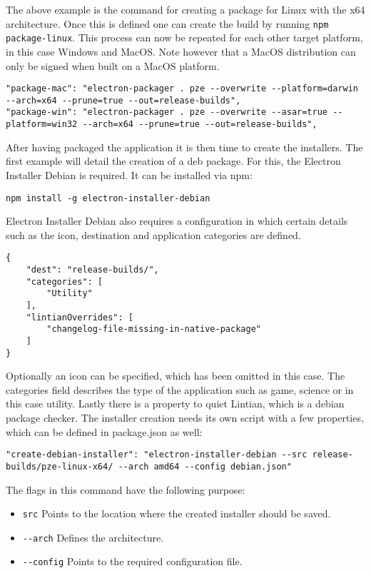 The above example is the command for creating a package for Linux with the x64 architecture.
Once this is defined one can create the build by running \lstinline[columns=fixed]{npm package-linux}.
This process can now be repeated for each other target platform, in this case Windows and MacOS. 
Note however that a MacOS distribution can only be signed when built on a MacOS platform. \parencite{electronDocsDist}
\begin{lstlisting}[caption=Commands for Windows and MacOs builds specified in package.json]
"package-mac": "electron-packager . pze --overwrite --platform=darwin --arch=x64 --prune=true --out=release-builds",
"package-win": "electron-packager . pze --overwrite --asar=true --platform=win32 --arch=x64 --prune=true --out=release-builds",
\end{lstlisting}
After having packaged the application it is then time to create the installers. 
The first example will detail the creation of a \acrshort{deb} package. 
For this, the Electron Installer Debian is required. 
It can be installed via \acrshort{npm}:
\begin{lstlisting}[caption=Installation of electron-installer-debian]
npm install -g electron-installer-debian
\end{lstlisting}
Electron Installer Debian also requires a configuration in which certain details such as the
icon, destination and application categories are defined.
\begin{lstlisting}[caption=Configuration for debian package: debian.json]
{
    "dest": "release-builds/",
    "categories": [
        "Utility"
    ],
    "lintianOverrides": [
        "changelog-file-missing-in-native-package"
    ]
}
\end{lstlisting}
Optionally an icon can be specified, which has been omitted in this case. 
The categories field describes the type of the application such as game, science or in this case utility.
Lastly there is a property to quiet Lintian, which is a debian package checker.
The installer creation needs its own script with a few properties, which can be defined in 
package.json as well:
\begin{lstlisting}[caption=Configuration for debian package: debian.json]
"create-debian-installer": "electron-installer-debian --src release-builds/pze-linux-x64/ --arch amd64 --config debian.json"
\end{lstlisting}
The flags in this command have the following purpose:
\begin{itemize}
    \item \lstinline[columns=fixed]{src} Points to the location where the created installer should be saved.
    \item \lstinline[columns=fixed]{--arch} Defines the architecture.
    \item \lstinline[columns=fixed]{--config} Points to the required configuration file.
\end{itemize}
